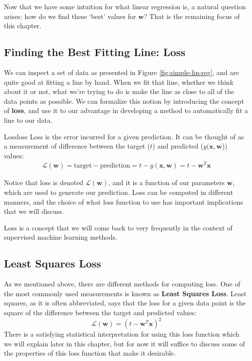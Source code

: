 
Now that we have some intuition for what linear regression is, a natural question arises: how do we find these `best' values for $\textbf{w}$? That is the remaining focus of this chapter.

\subsection{Finding the Best Fitting Line: Loss}
We can inspect a set of data as presented in Figure \ref{fig:simple-lin-reg}, and are quite good at fitting a line by hand. When we fit that line, whether we think about it or not, what we're trying to do is make the line as close to all of the data points as possible. We can formalize this notion by introducing the concept of \textbf{loss}, and use it to our advantage in developing a method to automatically fit a line to our data.


\begin{definition}{Loss}{loss}
Loss is the error incurred for a given prediction. It can be thought of as a measurement of difference between the target ($t$) and predicted ($y(\textbf{x}, \textbf{w}$)) values:
\begin{align*}
    \mathcal{L}(\textbf{w}) = \text{target} - \text{prediction} = t - y(\textbf{x}, \textbf{w}) = \boxed{t - \textbf{w}^{T}\textbf{x}}
\end{align*}

Notice that loss is denoted $\mathcal{L}(\textbf{w})$, and it is a function of our parameters $\textbf{w}$, which are used to generate our prediction. Loss can be computed in different manners, and the choice of what loss function to use has important implications that we will discuss.
\end{definition}

Loss is a concept that we will come back to very frequently in the context of supervised machine learning methods.

\subsection{Least Squares Loss}
As we mentioned above, there are different methods for computing loss. One of the most commonly used measurements is known as \textbf{Least Squares Loss}. Least squares, as it is often abbreviated, says that the loss for a given data point is the square of the difference between the target and predicted values:
\begin{equation} \label{least-squares-loss-fn}
    \mathcal{L}(\textbf{w}) = (t - \textbf{w}^{T}\textbf{x})^2
\end{equation}
There is a satisfying statistical interpretation for using this loss function which we will explain later in this chapter, but for now it will suffice to discuss some of the properties of this loss function that make it desirable.

